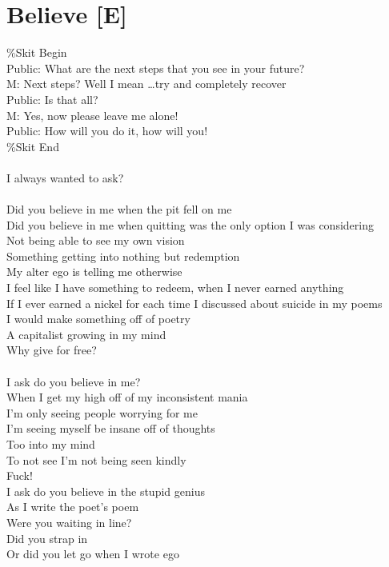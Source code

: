 \documentclass[12pt, b5paper, oneside]{book}
\begin{document}
\section{Believe [E]}
\%Skit Begin
\\Public: What are the next steps that you see in your future?
\\M: Next steps? Well I mean \dots try and completely recover
\\Public: Is that all?
\\M: Yes, now please leave me alone!
\\Public: How will you do it, how will you!
\\\%Skit End
%
\\\\I always wanted to ask?
%
\\\\Did you believe in me when the pit fell on me
\\Did you believe in me when quitting was the only option I was considering
\\Not being able to see my own vision
\\Something getting into nothing but redemption
\\My alter ego is telling me otherwise
\\I feel like I have something to redeem, when I never earned anything
\\If I ever earned a nickel for each time I discussed about suicide in my poems
\\I would make something off of poetry
\\A capitalist growing in my mind
\\Why give for free?
%
\\\\I ask do you believe in me?
\\When I get my high off of my inconsistent mania
\\I'm only seeing people worrying for me
\\I'm seeing myself be insane off of thoughts
\\Too into my mind
\\To not see I'm not being seen kindly
\\Fuck!
%
\\I ask do you believe in the stupid genius
\\As I write the poet's poem
\\Were you waiting in line?
\\Did you strap in
\\Or did you let go when I wrote ego
\end{document}
